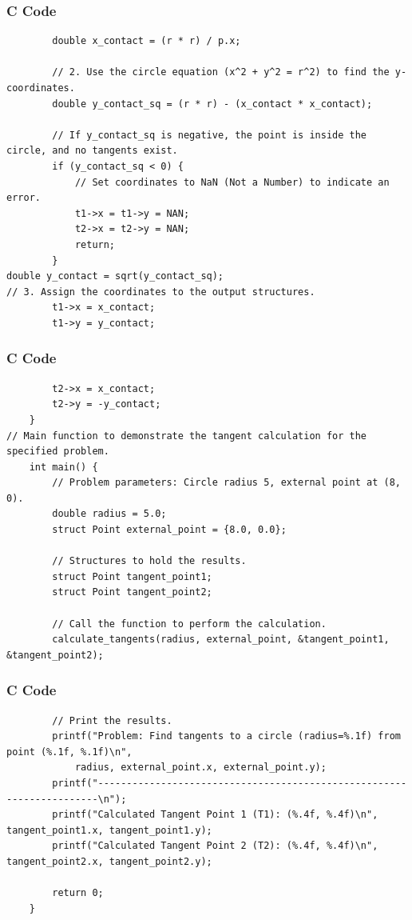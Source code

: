 \documentclass{beamer}
\begin{document}
\begin{frame}[fragile]
\frametitle{C Code}
\begin{lstlisting}
        double x_contact = (r * r) / p.x;

        // 2. Use the circle equation (x^2 + y^2 = r^2) to find the y-coordinates.
        double y_contact_sq = (r * r) - (x_contact * x_contact);

        // If y_contact_sq is negative, the point is inside the circle, and no tangents exist.
        if (y_contact_sq < 0) {
            // Set coordinates to NaN (Not a Number) to indicate an error.
            t1->x = t1->y = NAN;
            t2->x = t2->y = NAN;
            return;
        }
double y_contact = sqrt(y_contact_sq);
// 3. Assign the coordinates to the output structures.
        t1->x = x_contact;
        t1->y = y_contact;
\end{lstlisting}
\end{frame}
\begin{frame}[fragile]
\frametitle{C Code}
\begin{lstlisting}
        t2->x = x_contact;
        t2->y = -y_contact;
    }
// Main function to demonstrate the tangent calculation for the specified problem.
    int main() {
        // Problem parameters: Circle radius 5, external point at (8, 0).
        double radius = 5.0;
        struct Point external_point = {8.0, 0.0};

        // Structures to hold the results.
        struct Point tangent_point1;
        struct Point tangent_point2;

        // Call the function to perform the calculation.
        calculate_tangents(radius, external_point, &tangent_point1, &tangent_point2);
\end{lstlisting}
\end{frame}
\begin{frame}[fragile]
\frametitle{C Code}
\begin{lstlisting}
        // Print the results.
        printf("Problem: Find tangents to a circle (radius=%.1f) from point (%.1f, %.1f)\n",
            radius, external_point.x, external_point.y);
        printf("----------------------------------------------------------------------\n");
        printf("Calculated Tangent Point 1 (T1): (%.4f, %.4f)\n", tangent_point1.x, tangent_point1.y);
        printf("Calculated Tangent Point 2 (T2): (%.4f, %.4f)\n", tangent_point2.x, tangent_point2.y);

        return 0;
    }  
\end{lstlisting}
\end{frame}
\end{document}
